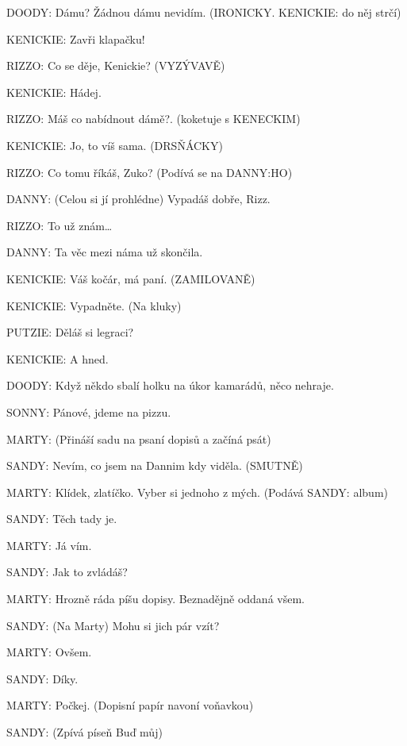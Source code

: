 \rep DOODY:        Dámu? Žádnou dámu nevidím. (IRONICKY. \rep KENICKIE: do něj strčí) 

\rep KENICKIE:        Zavři klapačku!

\rep RIZZO:        Co se děje, Kenickie? (VYZÝVAVĚ) 

\rep KENICKIE:        Hádej.

\rep RIZZO:        Máš co nabídnout dámě?. (koketuje s KENECKIM) 

\rep KENICKIE:        Jo, to víš sama. (DRSŇÁCKY) 

\rep RIZZO:        Co tomu říkáš, Zuko? (Podívá se na \rep DANNY:HO)

\rep DANNY:        (Celou si jí prohlédne) Vypadáš dobře, Rizz.

\rep RIZZO:         To už znám…

\rep DANNY:        Ta věc mezi náma už skončila.  

\rep KENICKIE:        Váš kočár, má paní. (ZAMILOVANĚ) 

\rep KENICKIE:        Vypadněte. (Na kluky)

\rep PUTZIE:        Děláš si legraci?

\rep KENICKIE:        A hned.

\rep DOODY:        Když někdo sbalí holku na úkor kamarádů, něco nehraje. 

\rep SONNY:        Pánové, jdeme na pizzu.

        

\rep MARTY:        (Přináší sadu na psaní dopisů a začíná psát)

\rep SANDY:        Nevím, co jsem na Dannim kdy viděla. (SMUTNĚ)

\rep MARTY:        Klídek, zlatíčko. Vyber si jednoho z mých. (Podává \rep SANDY: album)

\rep SANDY:        Těch tady je. 

\rep MARTY:        Já vím.

\rep SANDY:        Jak to zvládáš?

\rep MARTY:        Hrozně ráda píšu dopisy. Beznadějně oddaná všem.

\rep SANDY:        (Na Marty) Mohu si jich pár vzít?

\rep MARTY:        Ovšem.

\rep SANDY:        Díky.

\rep MARTY:        Počkej. (Dopisní papír navoní voňavkou)

\rep SANDY:        (Zpívá píseň Buď můj)


